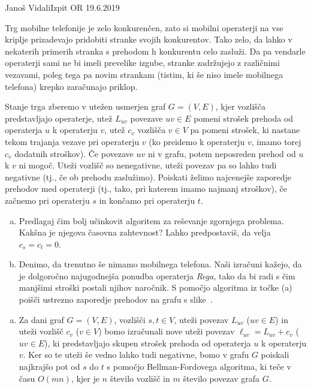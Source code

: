 \begin{naloga}{Janoš Vidali}{Izpit OR 19.6.2019}
\begin{vprasanje}
Trg mobilne telefonije je zelo konkurenčen,
zato si mobilni operaterji na vse kriplje
prizadevajo pridobiti stranke svojih konkurentov.
Tako zelo, da lahko v nekaterih primerih
stranka s prehodom h konkurentu celo zasluži.
Da pa vendarle operaterji sami ne bi imeli prevelike izgube,
stranke zadržujejo z različnimi vezavami,
poleg tega pa novim strankam
(tistim, ki še niso imele mobilnega telefona)
krepko zaračunajo priklop.

Stanje trga zberemo v utežen usmerjen graf $G = (V, E)$,
kjer vozlišča pred\-stav\-lja\-jo operaterje,
utež $L_{uv}$ povezave $uv \in E$
pomeni strošek prehoda od operaterja $u$ k operaterju $v$,
utež $c_v$ vozlišča $v \in V$ pa pomeni strošek,
ki nastane tekom trajanja vezave pri operaterju $v$
(ko preidemo k operaterju $v$, imamo torej $c_v$ dodatnih stroškov).
Če povezave $uv$ ni v grafu, potem neposreden prehod od $u$ k $v$ ni mogoč.
Uteži vozlišč so nenegativne,
uteži povezav pa so lahko tudi negativne (tj., če ob prehodu zaslužimo).
Poiskati želimo najcenejše zaporedje prehodov med operaterji
(tj., tako, pri katerem imamo najmanj stroškov),
če začnemo pri operaterju $s$ in končamo pri operaterju $t$.

\begin{enumerate}[(a)]
\item Predlagaj čim bolj učinkovit algoritem za reševanje zgornjega problema.
Kak\-šna je njegova časovna zahtevnost?
Lahko predpostaviš, da velja $c_s = c_t = 0$.

\item Denimo, da trenutno še nimamo mobilnega telefona.
Naši izračuni kažejo,
da je dolgoročno najugodnejša ponudba operaterja {\em Rega},
tako da bi radi s čim manjšimi stroški postali njihov naročnik.
S pomočjo algoritma iz točke (a)
poišči ustrezno zaporedje prehodov na grafu s slike~\fig.
\end{enumerate}

\begin{slika}
\pgfslika
{}
\end{slika}
\end{vprasanje}

\begin{odgovor}
\begin{enumerate}[(a)]
\item Za dani graf $G = (V, E)$, vozlišči $s, t \in V$,
uteži povezav $L_{uv}$ ($uv \in E$) in uteži vozlišč $c_v$ ($v \in V$)
bomo izračunali nove uteži povezav $\ell_{uv} = L_{uv} + c_v$ ($uv \in E$),
ki predstavljajo skupen strošek prehoda od operaterja $u$ k operaterju $v$.
Ker so te uteži še vedno lahko tudi negativne,
bomo v grafu $G$ poiskali najkrajšo pot od $s$ do $t$
s pomočjo Bellman-Fordovega algoritma,
ki teče v času $O(mn)$,
kjer je $n$ število vozlišč in $m$ število povezav grafa $G$.


\end{enumerate}
\end{odgovor}
\end{naloga}
